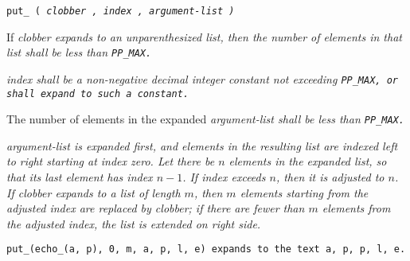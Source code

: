 
\tt{put_ (} \it{clobber} \tt{,} \it{index} \tt{,} \it{argument-list} \tt{)}


If \it{clobber} expands to an unparenthesized list,
then the number of elements in that list shall be less than \tt{PP_MAX}.

\it{index} shall be a non-negative decimal integer constant not
exceeding \tt{PP_MAX}, or shall expand to such a constant.

The number of elements in the expanded
\it{argument-list} shall be less than \tt{PP_MAX}.


\it{argument-list} is expanded first, and elements in the
resulting list are indexed left to right starting at index zero.
Let there be $n$ elements in the expanded list,
so that its last element has index $n - 1$.
If \it{index} exceeds $n$, then it is adjusted to $n$.
If \it{clobber} expands to a list of length $m$, then $m$ elements starting
from the adjusted index are replaced by \it{clobber}; if there are fewer than
$m$ elements from the adjusted index, the list is extended on right side.

\example \tt{put_(echo_(a, p), 0, m, a, p, l, e)}
expands to the text \tt{a, p, p, l, e}.

